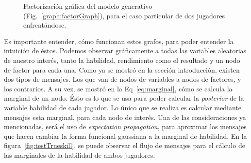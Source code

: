 \documentclass[11pt,twoside,spanish]{report} %
\begin{document}
\begin{figure}[H]
	\centering
\caption{ Factorizaci\'on gráfica del modelo generativo (Fig.~\ref{graph:factorGraph}), para el caso particular de dos jugadores enfrent\'andose.}
\label{fig:ejfig1vs1}
\end{figure}



Es importante entender, c\'omo funcionan estos grafos, para poder entender la intuici\'on de \'estos.
Podemos observar gr\'aficamente a todas las variables aleatorias de nuestro inter\'es, tanto la habilidad, rendimiento como el resultado y un nodo de factor para cada una.
Como ya se mostr\'o en la secci\'on introducci\'on, existen dos tipos de mensajes.
Los que van de nodos de variables a nodos de factores, y los contrarios.
A su vez, se mostr\'o en la Eq~\ref{eq:marginal}, c\'omo se calcula la marginal de un nodo.
\'Esto es lo que se usa para poder calcular la \textit{posterior} de la variable habilidad de cada jugador.
Lo \'unico que se realiza es calcular mediante mensajes esta marginal, para cada nodo de inter\'es.
Una de las consideraciones ya mencionadas, ser\'a el uso de \textit{expectation propagation}, para aproximar los mensajes que hacen cambiar la forma funcional gaussiana a la marginal de habilidad.
En la figura~\ref{fig:testTrueskill}, se puede observar el flujo de mensajes para el c\'alculo de las marginales de la habilidad de ambos jugadores.
\end{document}
